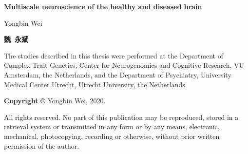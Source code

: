 \documentclass[10pt,twoside,final]{book}
\def\maintitle{Multiscale neuroscience of the healthy and diseased brain}
\def\authors{Yongbin Wei}
\def\locationdate{Amsterdam, 22-11-2019}
\begin{document}
\selectfont	

\frontmatter
\pagestyle{empty}

\begin{center}
  \vspace*{3cm}
  {\huge\bfseries\maintitle\par}
  \vspace{25em}%
  {\Large\authors\par}
  \vspace{3mm}%
  \begin{CJK*}{UTF8}{gbsn}
  \textbf{魏\ 永斌}
  \clearpage\end{CJK*} 
\end{center}

\newpage

\vspace*{\fill}
\noindent
The studies described in this thesis were performed at the Department of Complex Trait Genetics, Center for Neurogenomics and Cognitive Research, VU Amsterdam, the Netherlands, and the Department of Psychiatry, University Medical Center Utrecht, Utrecht University, the Netherlands.

\vspace{0.5cm}
\noindent
\textbf{Copyright} © Yongbin Wei, 2020. 

\vspace{0.1cm}
\noindent
All rights reserved. No part of this publication may be reproduced, stored in a retrieval system or transmitted in any form or by any means, electronic, mechanical, photocopying, recording or otherwise, without  prior written permission of the author.
\end{document}
